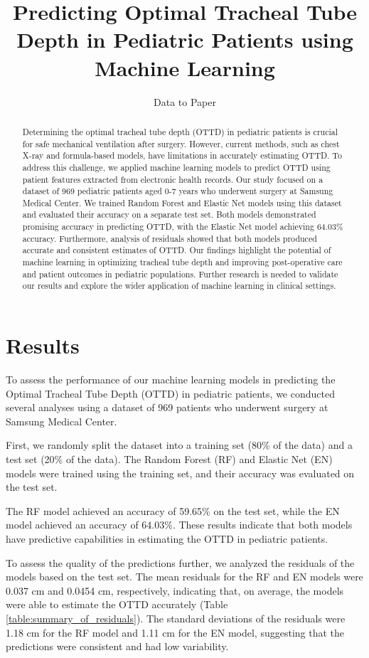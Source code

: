 \documentclass[11pt]{article}
\title{Predicting Optimal Tracheal Tube Depth in Pediatric Patients using Machine Learning}
\author{Data to Paper}
\begin{document}
\maketitle
\begin{abstract}
Determining the optimal tracheal tube depth (OTTD) in pediatric patients is crucial for safe mechanical ventilation after surgery. However, current methods, such as chest X-ray and formula-based models, have limitations in accurately estimating OTTD. To address this challenge, we applied machine learning models to predict OTTD using patient features extracted from electronic health records. Our study focused on a dataset of 969 pediatric patients aged 0-7 years who underwent surgery at Samsung Medical Center. We trained Random Forest and Elastic Net models using this dataset and evaluated their accuracy on a separate test set. Both models demonstrated promising accuracy in predicting OTTD, with the Elastic Net model achieving 64.03\% accuracy. Furthermore, analysis of residuals showed that both models produced accurate and consistent estimates of OTTD. Our findings highlight the potential of machine learning in optimizing tracheal tube depth and improving post-operative care and patient outcomes in pediatric populations. Further research is needed to validate our results and explore the wider application of machine learning in clinical settings. 
\end{abstract}
\section*{Results}

To assess the performance of our machine learning models in predicting the Optimal Tracheal Tube Depth (OTTD) in pediatric patients, we conducted several analyses using a dataset of 969 patients who underwent surgery at Samsung Medical Center. 

First, we randomly split the dataset into a training set (80\% of the data) and a test set (20\% of the data). The Random Forest (RF) and Elastic Net (EN) models were trained using the training set, and their accuracy was evaluated on the test set.

The RF model achieved an accuracy of 59.65\% on the test set, while the EN model achieved an accuracy of 64.03\%. These results indicate that both models have predictive capabilities in estimating the OTTD in pediatric patients.

To assess the quality of the predictions further, we analyzed the residuals of the models based on the test set. The mean residuals for the RF and EN models were 0.037 cm and 0.0454 cm, respectively, indicating that, on average, the models were able to estimate the OTTD accurately (Table \ref{table:summary_of_residuals}). The standard deviations of the residuals were 1.18 cm for the RF model and 1.11 cm for the EN model, suggesting that the predictions were consistent and had low variability.
\end{document}
